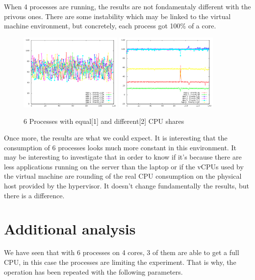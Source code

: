When 4 processes are running, the results are not fondamentaly different with
the privous ones. There are some instability which may be linked to the virtual
machine environment, but concretely, each process got 100\% of a core.

\begin{figure}[h!]
\begin{center}
	\includegraphics[width=0.45\textwidth]{./Images/CpuMonitor/vm/6_equalshares.png}
	\includegraphics[width=0.45\textwidth]{./Images/CpuMonitor/vm/6_differentshares.png}
	\caption{6 Processes with equal[1] and different[2] CPU shares}
\end{center}
\end{figure}

Once more, the results are what we could expect. It is interesting that the
consumption of 6 processes looks much more constant in this environment. It
may be interesting to investigate that in order to know if it's because there
are less applications running on the server than the laptop or if the vCPUs used
by the virtual machine are rounding of the real CPU consumption on the physical
host provided by the hypervisor. It doesn't change fundamentally the results,
but there is a difference.

\section{Additional analysis}

We have seen that with 6 processes on 4 cores, 3 of them are able to get a full
CPU, in this case the processes are limiting the experiment. That is why, the 
operation has been repeated with the following parameters.

